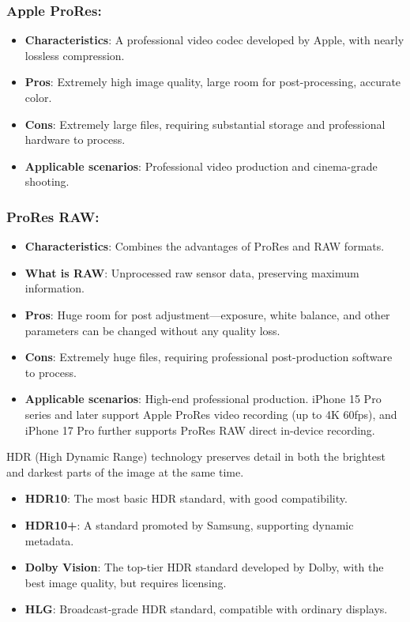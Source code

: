 \subsubsection*{Apple ProRes:}

\begin{itemize}
  \item \textbf{Characteristics}: A professional video codec developed by Apple, with nearly lossless compression.
  \item \textbf{Pros}: Extremely high image quality, large room for post-processing, accurate color.
  \item \textbf{Cons}: Extremely large files, requiring substantial storage and professional hardware to process.
  \item \textbf{Applicable scenarios}: Professional video production and cinema-grade shooting.
\end{itemize}

\subsubsection*{ProRes RAW:}

\begin{itemize}
  \item \textbf{Characteristics}: Combines the advantages of ProRes and RAW formats.
  \item \textbf{What is RAW}: Unprocessed raw sensor data, preserving maximum information.
  \item \textbf{Pros}: Huge room for post adjustment—exposure, white balance, and other parameters can be changed without any quality loss.
  \item \textbf{Cons}: Extremely huge files, requiring professional post-production software to process.
  \item \textbf{Applicable scenarios}: High-end professional production. iPhone 15 Pro series and later support Apple ProRes video recording (up to 4K 60fps), and iPhone 17 Pro further supports ProRes RAW direct in-device recording.
\end{itemize}


HDR (High Dynamic Range) technology preserves detail in both the brightest and darkest parts of the image at the same time.

\begin{itemize}
  \item \textbf{HDR10}: The most basic HDR standard, with good compatibility.
  \item \textbf{HDR10+}: A standard promoted by Samsung, supporting dynamic metadata.
  \item \textbf{Dolby Vision}: The top-tier HDR standard developed by Dolby, with the best image quality, but requires licensing.
  \item \textbf{HLG}: Broadcast-grade HDR standard, compatible with ordinary displays.
\end{itemize}

